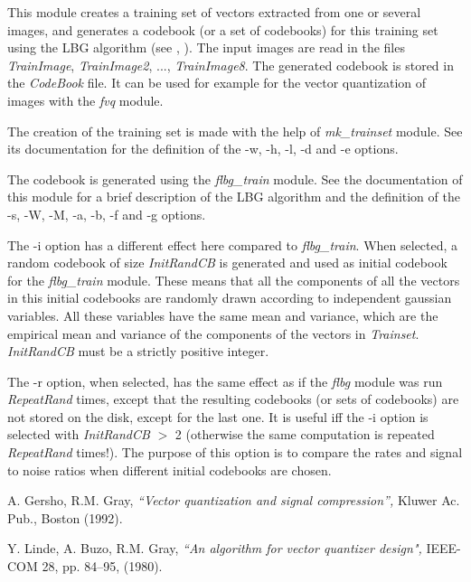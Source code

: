 This module creates a training set of vectors extracted from one or several 
images, and generates a codebook (or a set of codebooks) 
for this training set using the LBG algorithm (see \cite{kn:lbg}, 
\cite{kn:gg}). The input images are read 
in the files {\em TrainImage}, {\em TrainImage2}, ..., {\em TrainImage8}. 
The generated codebook is stored in the {\em CodeBook} file. 
It can be used for example for the vector quantization of images 
with the {\em fvq} module. 

The creation of the training set is made with the help of {\em mk\_trainset} 
module. See its documentation for the definition of the -w, -h, -l, -d and -e 
options. 

The codebook is generated using the {\em flbg\_train} module. See the 
documentation of this module for a brief description of the LBG algorithm 
and the definition of the -s, -W, -M, -a, -b, -f and -g options. 

The -i option has a different effect here compared to {\em flbg\_train}. 
When selected, a random codebook of size {\em InitRandCB} is generated 
and used as initial codebook for the {\em flbg\_train} module. 
These means that all the components of all the vectors in this initial 
codebooks are randomly drawn according to independent gaussian variables. 
All these variables have the same mean and variance, which are the 
empirical mean and variance of the components of the vectors 
in {\em Trainset}. {\em InitRandCB} must be a strictly positive integer. 

The -r option, when selected, has the same effect as if the {\em flbg} 
module was run {\em RepeatRand} times, except that the resulting 
codebooks (or sets of codebooks) are not stored on the disk, 
except for the last one. 
It is useful iff the -i option is selected with {\em InitRandCB} $>$ 2 
(otherwise the same computation is repeated {\em RepeatRand} times!). 
The purpose of this option is to compare the rates and signal to noise ratios 
when different initial codebooks are chosen.


\begin{thebibliography}{999999}

 A. Gersho, R.M. Gray, {\em ``Vector quantization 
and signal compression'', } Kluwer Ac. Pub., Boston (1992). 

 Y. Linde, A. Buzo, R.M. Gray, {\em ``An algorithm for 
vector quantizer design", } IEEE-COM 28, pp. 84--95, (1980).

\end{thebibliography}
